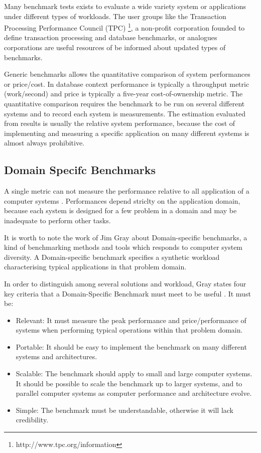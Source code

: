 Many benchmark tests exists to evaluate a wide variety system or applications under different types of workloads. The user groups like the Transaction Processing Performance Council (TPC) \footnote{http://www.tpc.org/information},  a non-profit corporation founded to define transaction processing and database benchmarks, or analogues corporations are useful resources of be informed about updated types of benchmarks. 

Generic benchmarks allows the quantitative comparison of system performances or price/cost. In database context performance is typically a throughput metric (work/second) and price is typically a five-year cost-of-ownership metric. The quantitative comparison requires the benchmark to be run on several different systems and to record each system is measurements.  The estimation evaluated from results is usually the relative system performance, because the cost of implementing and measuring a specific application on many different systems is almost always prohibitive.

\subsection{Domain Specifc Benchmarks}  \label{sec:tcp}

A single metric can not measure the performance relative to all application of a computer systems \cite{DBLP:books/mk/Gray93}. Performances depend striclty on the application domain, because each system is designed for a few problem in a domain and may be inadequate to perform other tasks.

It is worth to note the work of Jim Gray about Domain-specific benchmarks, a kind of benchmarking methods and tools  which responds to computer system diversity. A Domain-specific benchmark specifies a synthetic workload characterising typical applications in that problem domain. 

In order to distinguish among several solutions and workload, Gray states four key criteria that a Domain-Specific Benchmark must meet to be useful \cite{DBLP:books/mk/Gray93}. It must be:
\begin{itemize}
\item Relevant: It must measure the peak performance and price/performance of systems when performing typical operations within that problem domain.
\item Portable: It should be easy to implement the benchmark on many different systems and architectures.
\item Scalable: The benchmark should apply to small and large computer systems. It should be possible to scale the benchmark up to larger systems, and to parallel computer systems as computer performance and architecture evolve.
\item Simple: The benchmark must be understandable, otherwise it will lack credibility.
\end{itemize} 

